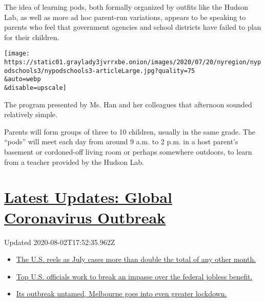 The idea of learning pods, both formally organized by outfits like the
Hudson Lab, as well as more ad hoc parent-run variations, appears to be
speaking to parents who feel that government agencies and school
districts have failed to plan for their children.

\texttt{[image: https://static01.graylady3jvrrxbe.onion/images/2020/07/20/nyregion/nypodschools3/nypodschools3-articleLarge.jpg?quality=75\\\&auto=webp\\\&disable=upscale]}

The program presented by Ms. Han and her colleagues that afternoon
sounded relatively simple.

Parents will form groups of three to 10 children, usually in the same
grade. The ``pods'' will meet each day from around 9 a.m. to 2 p.m. in a
host parent's basement or cordoned-off living room or perhaps somewhere
outdoors, to learn from a teacher provided by the Hudson Lab.

\hypertarget{latest-updates-global-coronavirus-outbreak}{%
\section{\texorpdfstring{\href{https://www.nytimes3xbfgragh.onion/2020/08/01/world/coronavirus-covid-19.html?action=click\&pgtype=Article\&state=default\&region=MAIN_CONTENT_1\&context=storylines_live_updates}{Latest
Updates: Global Coronavirus
Outbreak}}{Latest Updates: Global Coronavirus Outbreak}}\label{latest-updates-global-coronavirus-outbreak}}

Updated 2020-08-02T17:52:35.962Z

\begin{itemize}
\tightlist
\item
  \href{https://www.nytimes3xbfgragh.onion/2020/08/01/world/coronavirus-covid-19.html?action=click\&pgtype=Article\&state=default\&region=MAIN_CONTENT_1\&context=storylines_live_updates\#link-34047410}{The
  U.S. reels as July cases more than double the total of any other
  month.}
\item
  \href{https://www.nytimes3xbfgragh.onion/2020/08/01/world/coronavirus-covid-19.html?action=click\&pgtype=Article\&state=default\&region=MAIN_CONTENT_1\&context=storylines_live_updates\#link-780ec966}{Top
  U.S. officials work to break an impasse over the federal jobless
  benefit.}
\item
  \href{https://www.nytimes3xbfgragh.onion/2020/08/01/world/coronavirus-covid-19.html?action=click\&pgtype=Article\&state=default\&region=MAIN_CONTENT_1\&context=storylines_live_updates\#link-2bc8948}{Its
  outbreak untamed, Melbourne goes into even greater lockdown.}
\end{itemize}


